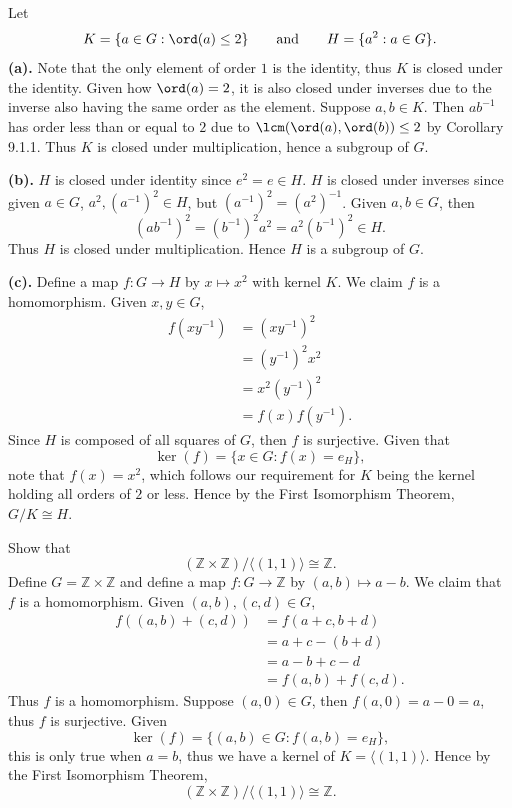 \begin{problem}[Exercise 14]{
    Let
    \[
        K = \{a \in G : \ord(a) \leq 2\}
        \qquad\text{and}\qquad
        H = \{a^2 : a \in G\}.
    \]
}
    \textbf{(a).}
    Note that the only element of order $1$ is the identity, thus $K$ is closed under the identity.
    Given how $\ord(a) = 2$, it is also closed under inverses due to the inverse also having the same order as the element.
    Suppose $a,b \in K$.
    Then $ab^{-1}$ has order less than or equal to $2$ due to $\lcm(\ord(a),\ord(b)) \leq 2$ by Corollary 9.1.1.
    Thus $K$ is closed under multiplication, hence a subgroup of $G$.

    \textbf{(b).}
    $H$ is closed under identity since $e^2 = e \in H$.
    $H$ is closed under inverses since given $a \in G$, $a^2,(a^{-1})^2 \in H$, but $(a^{-1})^2 = (a^2)^{-1}$.
    Given $a,b \in G$, then
    \[
        (ab^{-1})^2 = (b^{-1})^2a^2 = a^2(b^{-1})^2 \in H.
    \]
    Thus $H$ is closed under multiplication.
    Hence $H$ is a subgroup of $G$.

    \textbf{(c).}
    Define a map $f : G \to H$ by $x \mapsto x^2$ with kernel $K$.
    We claim $f$ is a homomorphism.
    Given $x,y \in G$,
    \begin{align*}
        f(xy^{-1}) &= (xy^{-1})^2\\
        &= (y^{-1})^2x^2\\
        &= x^2(y^{-1})^2\\
        &= f(x)f(y^{-1}).
    \end{align*}
    Since $H$ is composed of all squares of $G$, then $f$ is surjective.
    Given that
    \[
        \ker(f) = \{x \in G : f(x) = e_H\},
    \]
    note that $f(x) = x^2$, which follows our requirement for $K$ being the kernel holding all orders of $2$ or less.
    Hence by the First Isomorphism Theorem, $G/K \cong H$.
\end{problem}

\begin{problem}[Exercise 15]{
    Show that
    \[
        (\mathbb{Z} \times \mathbb{Z})/\langle(1,1)\rangle \cong \mathbb{Z}.
    \]
}
    Define $G = \mathbb{Z} \times \mathbb{Z}$ and define a map $f : G \to \mathbb{Z}$ by $(a,b) \mapsto a-b$.
    We claim that $f$ is a homomorphism.
    Given $(a,b),(c,d) \in G$,
    \begin{align*}
        f((a,b) + (c,d)) &= f(a+c,b+d)\\
        &= a+c-(b+d)\\
        &= a-b+c-d\\
        &= f(a,b) + f(c,d).
    \end{align*}
    Thus $f$ is a homomorphism.
    Suppose $(a,0) \in G$, then $f(a,0) = a-0 = a$, thus $f$ is surjective.
    Given
    \[
        \ker(f) = \{(a,b) \in G : f(a,b) = e_H\},
    \]
    this is only true when $a=b$, thus we have a kernel of $K = \langle(1,1)\rangle$.
    Hence by the First Isomorphism Theorem,
    \[
        (\mathbb{Z} \times \mathbb{Z})/\langle(1,1)\rangle \cong \mathbb{Z}.
    \]
\end{problem}

